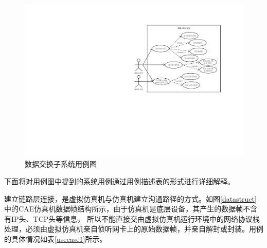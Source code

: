 \begin{figure}[h!]
    \begin{center}
        \includegraphics[width=\textwidth]{pictures/usecase.pdf}
        \caption{数据交换子系统用例图}
        \label{usecase}
    \end{center}
\end{figure}

\par
下面将对用例图中提到的系统用例通过用例描述表的形式进行详细解释。
\par
建立链路层连接，是虚拟仿真机与仿真机建立沟通路径的方式。如图\ref{datastruct}中的CAE仿真机数据帧结构所示，由于仿真机是底层设备，其产生的数据帧不含有IP头、TCP头等信息，
所以不能直接交由虚拟仿真机运行环境中的网络协议栈处理，必须由虚拟仿真机亲自侦听网卡上的原始数据帧，并亲自解封或封装。用例的具体情况如表\ref{usecase1}所示。

